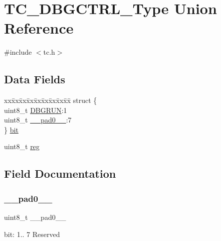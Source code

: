 \hypertarget{union_t_c___d_b_g_c_t_r_l___type}{}\section{T\+C\+\_\+\+D\+B\+G\+C\+T\+R\+L\+\_\+\+Type Union Reference}
\label{union_t_c___d_b_g_c_t_r_l___type}


{\ttfamily \#include $<$tc.\+h$>$}

\subsection*{Data Fields}
\begin{DoxyCompactItemize}
\item 
\begin{tabbing}
xx\=xx\=xx\=xx\=xx\=xx\=xx\=xx\=xx\=\kill
struct \{\\
\>uint8\_t \mbox{\hyperlink{union_t_c___d_b_g_c_t_r_l___type_a1e1cc79f6834369b9dd0c6676a0d8781}{DBGRUN}}:1\\
\>uint8\_t \mbox{\hyperlink{union_t_c___d_b_g_c_t_r_l___type_a8b4eebe79ded0459acec2f4950102ba3}{\_\_pad0\_\_}}:7\\
\} \mbox{\hyperlink{union_t_c___d_b_g_c_t_r_l___type_a22e38bae43fa82a5a8d4e934c8cbd1dc}{bit}}\\

\end{tabbing}\item 
uint8\+\_\+t \mbox{\hyperlink{union_t_c___d_b_g_c_t_r_l___type_a9428adc9af4653a2050e2536b55dec8d}{reg}}
\end{DoxyCompactItemize}


\subsection{Field Documentation}
\mbox{\label{union_t_c___d_b_g_c_t_r_l___type_a8b4eebe79ded0459acec2f4950102ba3}} 
\subsubsection{\texorpdfstring{\_\_pad0\_\_}{\_\_pad0\_\_}}
{\footnotesize\ttfamily uint8\+\_\+t \+\_\+\+\_\+pad0\+\_\+\+\_\+}

bit\+: 1.. 7 Reserved \mbox{\label{union_t_c___d_b_g_c_t_r_l___type_a22e38bae43fa82a5a8d4e934c8cbd1dc}} 
